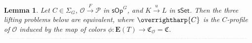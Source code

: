 \documentclass[a4paper,10pt
,draft
]{article}%
\numberwithin{equation}{section}
\numberwithin{figure}{section}
\newtheorem{lemma}[equation]{Lemma}%
\theoremstyle{definition} %
\newcommand{\set}[1]{\left\{#1\right\}}%
\newcommand{\vect}[1]{\text{\overrightharp{\ensuremath{#1}}}}
\newcommand{\Set}{\ensuremath{\mathsf{Set}}}
\newcommand{\sSet}{\ensuremath{\mathsf{sSet}}}%
\newcommand{\sOp}{\ensuremath{\mathsf{sOp}}}%
\DeclareMathOperator{\Hom}{Hom}%
\DeclareMathOperator{\Aut}{Aut}%
\renewcommand{\O}{\ensuremath{\mathcal O}}
\renewcommand{\P}{\ensuremath{\mathcal P}}
\newcommand{\1}{\ensuremath{\mathbbm 1}}%
\begin{document}
\begin{lemma}
      \label{OPTENS_LEM}
      Let $C \in \Sigma_G$, $\O \xrightarrow{F} \P$ in $\sOp^G$, and $K \xrightarrow{u} L$ in $\sSet$.
      Then the three lifting problems below are equivalent,
      where $\vect C$ is the $C$-profile of $\O$ induced by the map of colors $\phi \colon \boldsymbol{E}(T) \to \mathfrak C_\O = \mathfrak C$.
      \begin{equation}
            \resizebox{\textwidth}{!}{%
              \begin{tikzcd}[column sep = small, ampersand replacement = \&]
                    \Omega(C) \otimes_\Set K \arrow[r, "\phi"] \arrow[d, "u"']
                    \&
                    \O \arrow[d, "F"']
                    \& %
                    K \arrow[r] \arrow[d, "u"]
                    \&
                    \O(\vect C)^{\Aut_{G \ltimes \Sigma_{\mathfrak C}}(\vect C)} \arrow[d, "{F(\vect C)}"]
                    \& %
                    \partial \Omega(C) \arrow[r, "\phi"] \arrow[d]
                    \&
                    \set{L,\O}_\Set \arrow[d, "{u^{\**}, F_{\**}}"]
                    \\
                    \Omega(C) \otimes_\Set L \arrow[r] \arrow[ur, dashed]
                    \&
                    \P 
                    \& %
                    L \arrow[r] \arrow[ur, dashed]
                    \&
                    \P(F(\vect C))^{\Aut_{G \ltimes \Sigma_{\mathfrak C}}(\vect C)} 
                    \& %
                    \Omega(C) \arrow[r] \arrow[ur, dashed]
                    \&
                    \displaystyle{
                      \set{K,\O}_\Set \mathop{\times}\limits_{\set{K,\P}_\Set} \set{L,\P}_\Set
                    }
              \end{tikzcd}
            }
      \end{equation}
\end{lemma}
\end{document}
